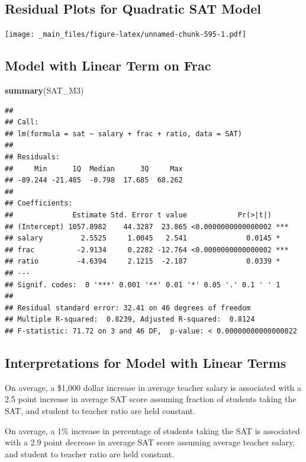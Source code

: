 \documentclass[]{book}
\newenvironment{Shaded}{\begin{snugshade}}{\end{snugshade}}
\newcommand{\KeywordTok}[1]{\textcolor[rgb]{0.13,0.29,0.53}{\textbf{#1}}}
\newcommand{\NormalTok}[1]{#1}
\begin{document}
\subsection{Residual Plots for Quadratic SAT
Model}\label{residual-plots-for-quadratic-sat-model}

\texttt{[image: \_main\_files/figure-latex/unnamed-chunk-595-1.pdf]}

\subsection{Model with Linear Term on
Frac}\label{model-with-linear-term-on-frac}

\begin{Shaded}
\begin{Highlighting}[]
\KeywordTok{summary}\NormalTok{(SAT_M3)}
\end{Highlighting}
\end{Shaded}

\begin{verbatim}
## 
## Call:
## lm(formula = sat ~ salary + frac + ratio, data = SAT)
## 
## Residuals:
##     Min      1Q  Median      3Q     Max 
## -89.244 -21.485  -0.798  17.685  68.262 
## 
## Coefficients:
##              Estimate Std. Error t value            Pr(>|t|)    
## (Intercept) 1057.8982    44.3287  23.865 <0.0000000000000002 ***
## salary         2.5525     1.0045   2.541              0.0145 *  
## frac          -2.9134     0.2282 -12.764 <0.0000000000000002 ***
## ratio         -4.6394     2.1215  -2.187              0.0339 *  
## ---
## Signif. codes:  0 '***' 0.001 '**' 0.01 '*' 0.05 '.' 0.1 ' ' 1
## 
## Residual standard error: 32.41 on 46 degrees of freedom
## Multiple R-squared:  0.8239, Adjusted R-squared:  0.8124 
## F-statistic: 71.72 on 3 and 46 DF,  p-value: < 0.00000000000000022
\end{verbatim}

\subsection{Interpretations for Model with Linear
Terms}\label{interpretations-for-model-with-linear-terms}

On average, a \$1,000 dollar increase in average teacher salary is
associated with a 2.5 point increase in average SAT score assuming
fraction of students taking the SAT, and student to teacher ratio are
held constant.

On average, a 1\% increase in percentage of students taking the SAT is
associated with a 2.9 point decrease in average SAT score assuming
average teacher salary, and student to teacher ratio are held constant.
\end{document}
